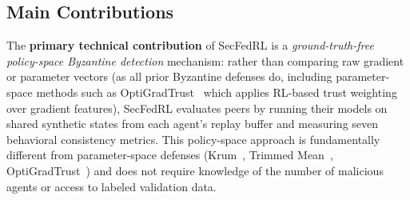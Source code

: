 \documentclass[12pt,a4paper]{article}
\begin{document}
\subsection*{Main Contributions}

The \textbf{primary technical contribution} of SecFedRL is a \textit{ground-truth-free
policy-space Byzantine detection} mechanism: rather than comparing raw gradient or
parameter vectors (as all prior Byzantine defenses do, including parameter-space
methods such as OptiGradTrust~\cite{ref1} which applies RL-based trust weighting over
gradient features), SecFedRL evaluates peers by running their models on shared
synthetic states from each agent's replay buffer and measuring seven behavioral
consistency metrics. This policy-space approach is fundamentally different from
parameter-space defenses (Krum~\cite{ref19}, Trimmed Mean~\cite{ref22},
OptiGradTrust~\cite{ref1}) and does not require knowledge of the number of malicious
agents or access to labeled validation data.
\end{document}

